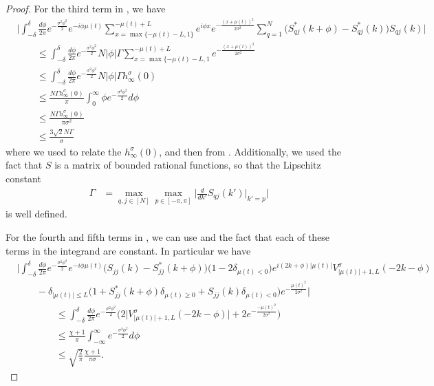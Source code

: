 \documentclass[../thesis-main/thesis-main]{subfiles}
\begin{document}
\begin{proof}
For the third term in , we have
\begin{align}
  &\Bigg|\int_{-\delta}^\delta \frac{d\phi}{2\pi} e^{-\frac{\sigma^2\phi^2}{2}} e^{-i \phi\mu(t)} \sum_{x=\max\{-\mu(t)-L,1\}}^{-\mu(t)+L} e^{i\phi x}e^{-\frac{(x+\mu(t))^2}{2\sigma^2}} \sum_{q=1}^N \big(S_{qj}^*(k+\phi) - S_{qj}^*(k)\big) S_{qj}(k) \Bigg|\nonumber\\
  &\qquad \leq \int_{-\delta}^\delta \frac{d\phi}{2\pi} e^{-\frac{\sigma^2\phi^2}{2}} N |\phi| \Gamma \sum_{x=\max\{-\mu(t)-L,1}^{-\mu(t) + L} e^{-\frac{(x+\mu(t))^2}{2\sigma^2}}\\
  &\qquad \leq \int_{-\delta}^\delta \frac{d\phi}{2\pi} e^{-\frac{\sigma^2\phi^2}{2}} N |\phi| \Gamma h_{\infty}^\sigma(0)\\
  &\qquad \leq \frac{N \Gamma h_\infty^\sigma(0)}{\pi} \int_{0}^\infty \phi e^{-\frac{\sigma^2\phi^2}{2}} d\phi\\
  &\qquad \leq \frac{N\Gamma h_\infty^\sigma(0)}{\pi\sigma^2}  \\
  &\qquad \leq \frac{3\sqrt{2} N \Gamma }{\sigma}
\end{align}
where we used  to relate the $h_\infty^\sigma(0)$, and then  from .  Additionally, we used the fact that $S$ is a matrix of bounded rational functions, so that the Lipschitz constant
\begin{align}
  \Gamma &= \max_{q,j\in [N]} \max_{p\in [-\pi,\pi]} \Bigg| \frac{d}{dk'} S_{qj}(k') \Big|_{k' = p} \Bigg|
\end{align}
is well defined.

For the fourth and fifth terms in , we can use  and the fact that each of these terms in the integrand are constant.  In particular we have
\begin{align}
  &\Bigg|\int_{-\delta}^\delta \frac{d\phi}{2\pi} e^{-\frac{\sigma^2\phi^2}{2}} e^{-i\phi\mu(t)} \big(S_{jj}(k) - S_{jj}^*(k+\phi)\big)\big(1 - 2\delta_{\mu(t) < 0}\big)e^{i(2k+\phi)|\mu(t)|} V_{|\mu(t)| + 1,L}^\sigma(-2k-\phi)\nonumber\\
  &\qquad - \delta_{|\mu(t)| \leq L} \Big(1 + S_{jj}^*(k+\phi) \delta_{\mu(t)\geq 0} + S_{jj}(k) \delta_{\mu(t)< 0}\Big)e^{-\frac{\mu(t)^2}{2\sigma^2}} \Bigg|\\
  &\qquad \qquad \leq \int_{-\delta}^\delta \frac{d\phi}{2\pi} e^{-\frac{\sigma^2\phi^2}{2}} \Big( 2 \big|V_{|\mu(t)|+1,L}^{\sigma}(-2k-\phi)\big| + 2e^{-\frac{-\mu(t)^2}{2\sigma^2}}\Big)\\
  &\qquad \qquad \leq \frac{\chi + 1}{\pi} \int_{-\infty}^\infty e^{-\frac{\sigma^2\phi^2}{2}}d\phi\\
  &\qquad\qquad \leq \sqrt{\frac{2}{\pi}} \frac{\chi + 1}{\pi\sigma}.
\end{align}


\end{proof}
\end{document}
